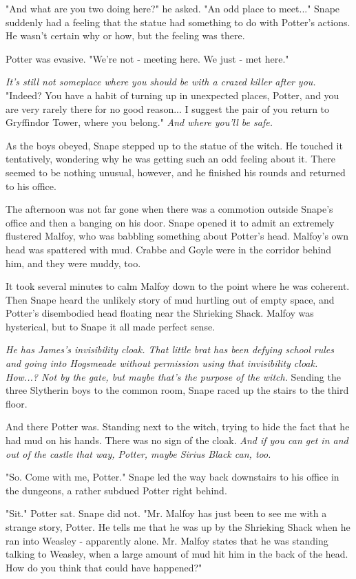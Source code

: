 \documentclass[a4paper,11pt]{article}
\begin{document}
"And what are you two doing here?" he asked. "An odd place to meet..." Snape suddenly had a feeling that the statue had something to do with Potter's actions. He wasn't certain why or how, but the feeling was there.

Potter was evasive. "We're not - meeting here. We just - met here."

\emph{It's still not someplace where you should be with a crazed killer after you.} "Indeed? You have a habit of turning up in unexpected places, Potter, and you are very rarely there for no good reason... I suggest the pair of you return to Gryffindor Tower, where you belong." \emph{And where you'll be safe.}

As the boys obeyed, Snape stepped up to the statue of the witch. He touched it tentatively, wondering why he was getting such an odd feeling about it. There seemed to be nothing unusual, however, and he finished his rounds and returned to his office.

The afternoon was not far gone when there was a commotion outside Snape's office and then a banging on his door. Snape opened it to admit an extremely flustered Malfoy, who was babbling something about Potter's head. Malfoy's own head was spattered with mud. Crabbe and Goyle were in the corridor behind him, and they were muddy, too.

It took several minutes to calm Malfoy down to the point where he was coherent. Then Snape heard the unlikely story of mud hurtling out of empty space, and Potter's disembodied head floating near the Shrieking Shack. Malfoy was hysterical, but to Snape it all made perfect sense.

\emph{He has James's invisibility cloak. That little brat has been defying school rules and going into Hogsmeade without permission using that invisibility cloak. How...? Not by the gate, but maybe that's the purpose of the witch.} Sending the three Slytherin boys to the common room, Snape raced up the stairs to the third floor.

And there Potter was. Standing next to the witch, trying to hide the fact that he had mud on his hands. There was no sign of the cloak. \emph{And if you can get in and out of the castle that way, Potter, maybe Sirius Black can, too.}

"So. Come with me, Potter." Snape led the way back downstairs to his office in the dungeons, a rather subdued Potter right behind.

"Sit." Potter sat. Snape did not. "Mr. Malfoy has just been to see me with a strange story, Potter. He tells me that he was up by the Shrieking Shack when he ran into Weasley - apparently alone. Mr. Malfoy states that he was standing talking to Weasley, when a large amount of mud hit him in the back of the head. How do you think that could have happened?"
\end{document}
